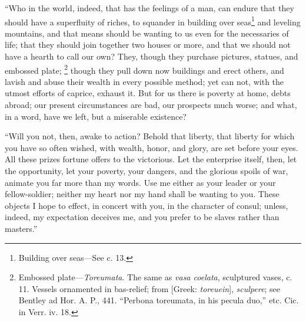 ``Who in the world, indeed, that has the feelings of a man, can endure
that they should have a superfluity of riches, to squander in building
over seas\footnote{Building over seas—See c. 13.} and leveling mountains, and that means should be wanting
to us even for the necessaries of life; that they should join together
two houses or more, and that we should not have a hearth to call our
own? They, though they purchase pictures, statues, and embossed plate;
\footnote{Embossed plate—\emph{Toreumata}. The same as \emph{vasa coelata},
sculptured vases, c. 11. Vessels ornamented in bas-relief; from
[Greek: \emph{toreuein}], \emph{sculpere}; see Bentley ad Hor. A. P., 441.
``Perbona toreumata, in his pecula duo,'' etc. Cic. in Verr. iv. 18.} though they pull down now buildings and erect others, and lavish
and abuse their wealth in every possible method; yet can not, with the
utmost efforts of caprice, exhaust it. But for us there is poverty at
home, debts abroad; our present circumstances are bad, our prospects
much worse; and what, in a word, have we left, but a miserable existence?

``Will you not, then, awake to action? Behold that liberty, that
liberty for which you have so often wished, with wealth, honor, and
glory, are set before your eyes. All these prizes fortune offers to
the victorious. Let the enterprise itself, then, let the opportunity,
let your poverty, your dangers, and the glorious spoils of war,
animate you far more than my words. Use me either as your leader or
your fellow-soldier; neither my heart nor my hand shall be wanting to
you. These objects I hope to effect, in concert with you, in the
character of consul; unless, indeed, my expectation deceives me, and
you prefer to be slaves rather than masters.''

